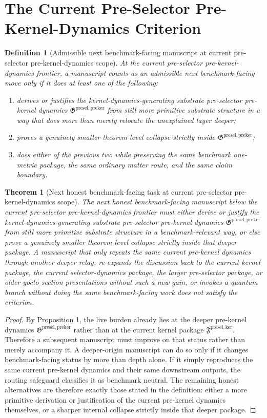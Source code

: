 \documentclass[11pt]{article}
\newcommand{\PreKernelPackage}{\mathfrak G^{\mathrm{presel,preker}}}
\newcommand{\KernelPackage}{\mathfrak F^{\mathrm{presel,ker}}}
\newtheorem{definition}{Definition}
\newtheorem{theorem}{Theorem}
\begin{document}
\section{The Current Pre-Selector Pre-Kernel-Dynamics Criterion}

\begin{definition}[Admissible next benchmark-facing manuscript at current pre-selector pre-kernel-dynamics scope]
At the current pre-selector pre-kernel-dynamics frontier, a manuscript counts as an admissible next benchmark-facing move only if it does at least one of the following:
\begin{enumerate}
    \item derives or justifies the kernel-dynamics-generating substrate pre-selector pre-kernel dynamics \(\PreKernelPackage\) from still more primitive substrate structure in a way that does more than merely relocate the unexplained layer deeper;
    \item proves a genuinely smaller theorem-level collapse strictly inside \(\PreKernelPackage\);
    \item does either of the previous two while preserving the same benchmark one-metric package, the same ordinary matter route, and the same claim boundary.
\end{enumerate}
\end{definition}

\begin{theorem}[Next honest benchmark-facing task at current pre-selector pre-kernel-dynamics scope]
The next honest benchmark-facing manuscript below the current pre-selector pre-kernel-dynamics frontier must either derive or justify the kernel-dynamics-generating substrate pre-selector pre-kernel dynamics \(\PreKernelPackage\) from still more primitive substrate structure in a benchmark-relevant way, or else prove a genuinely smaller theorem-level collapse strictly inside that deeper package. A manuscript that only repeats the same current pre-kernel dynamics through another deeper relay, re-expands the discussion back to the current kernel package, the current selector-dynamics package, the larger pre-selector package, or older yocto-section presentations without such a new gain, or invokes a quantum branch without doing the same benchmark-facing work does not satisfy the criterion.
\end{theorem}

\begin{proof}
By Proposition 1, the live burden already lies at the deeper pre-kernel dynamics \(\PreKernelPackage\) rather than at the current kernel package \(\KernelPackage\). Therefore a subsequent manuscript must improve on that status rather than merely accompany it. A deeper-origin manuscript can do so only if it changes benchmark-facing status by more than depth alone. If it simply reproduces the same current pre-kernel dynamics and their same downstream outputs, the routing safeguard classifies it as benchmark neutral. The remaining honest alternatives are therefore exactly those stated in the definition: either a more primitive derivation or justification of the current pre-kernel dynamics themselves, or a sharper internal collapse strictly inside that deeper package.
\end{proof}
\end{document}
